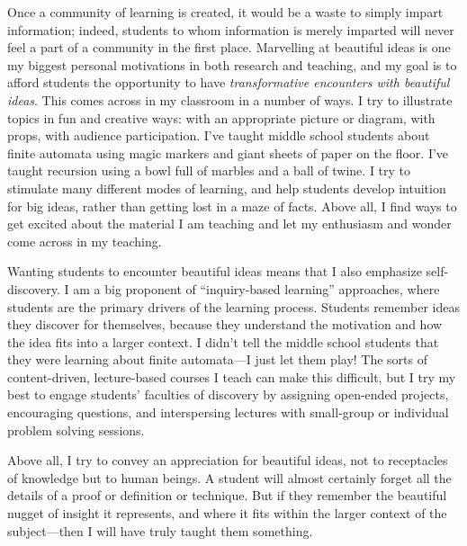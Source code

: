 \documentclass{article}
\begin{document}
Once a community of learning is created, it would be a waste to simply
impart information; indeed, students to whom information is merely
imparted will never feel a part of a community in the first
place. Marvelling at beautiful ideas is one my biggest personal
motivations in both research and teaching, and my goal is to afford
students the opportunity to have \emph{transformative encounters with
  beautiful ideas}.  This comes across in my classroom in a number of
ways.  I try to illustrate topics in fun and creative ways: with an
appropriate picture or diagram, with props, with audience
participation.  I've taught middle school students about finite
automata using magic markers and giant sheets of paper on the floor.
I've taught recursion using a bowl full of marbles and a ball of
twine.  I try to stimulate many different modes of learning, and help
students develop intuition for big ideas, rather than getting lost in
a maze of facts.  Above all, I find ways to get excited about the
material I am teaching and let my enthusiasm and wonder come across in
my teaching.

Wanting students to encounter beautiful ideas means that I also
emphasize self-discovery. I am a big proponent of ``inquiry-based
learning'' approaches, where students are the primary drivers of the
learning process. Students remember ideas they discover for
themselves, because they understand the motivation and how the idea
fits into a larger context. I didn't tell the middle school students
that they were learning about finite automata---I just let them play!
The sorts of content-driven, lecture-based courses I teach can make
this difficult, but I try my best to engage students' faculties of
discovery by assigning open-ended projects, encouraging questions, and
interspersing lectures with small-group or individual problem solving
sessions.


Above all, I try to convey an appreciation for beautiful ideas,
not to receptacles of knowledge but to human beings. A student will
almost certainly forget all the details of a proof or definition or
technique.  But if they remember the beautiful nugget of insight it
represents, and where it fits within the larger context of the
subject---then I will have truly taught them something.
\end{document}
